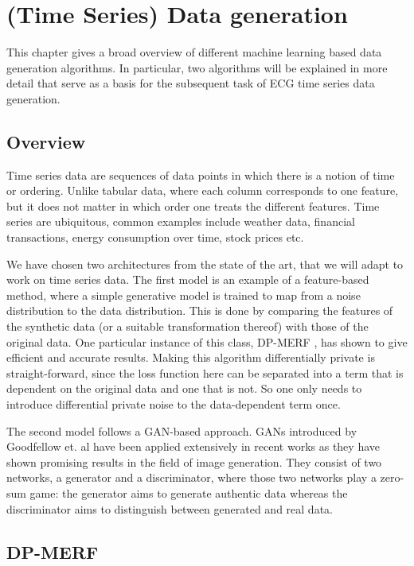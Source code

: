 \section{(Time Series) Data generation}
\label{chapter3}

This chapter gives a broad overview of different machine learning based data generation algorithms. In particular, two algorithms will be explained in more detail that serve as a basis for the subsequent task of ECG time series data generation.

\subsection{Overview}

Time series data are sequences of data points in which there is a notion of time or ordering. Unlike tabular data, where each column corresponds to one feature, but it does not matter in which order one treats the different features. Time series are ubiquitous, common examples include weather data, financial transactions, energy consumption over time, stock prices etc.

We have chosen two architectures from the state of the art, that we will adapt to work on time series data. The first model is an example of a feature-based method, where a simple generative model is trained to map from a noise distribution to the data distribution. This is done by comparing the features of the synthetic data (or a suitable transformation thereof) with those of the original data. One particular instance of this class, DP-MERF \parencite{dpmerf}, has shown to give efficient and accurate results. Making this algorithm differentially private is straight-forward, since the loss function here can be separated into a term that is dependent on the original data and one that is not. So one only needs to introduce differential private noise to the data-dependent term once.


The second model follows a GAN-based approach. GANs introduced by Goodfellow et. al \parencite{gan_og} have been applied extensively in recent works as they have shown promising results in the field of image generation. They consist of two networks, a generator and a discriminator, where those two networks play a zero-sum game: the generator aims to generate authentic data whereas the discriminator aims to distinguish between generated and real data.


\subsection{DP-MERF}

